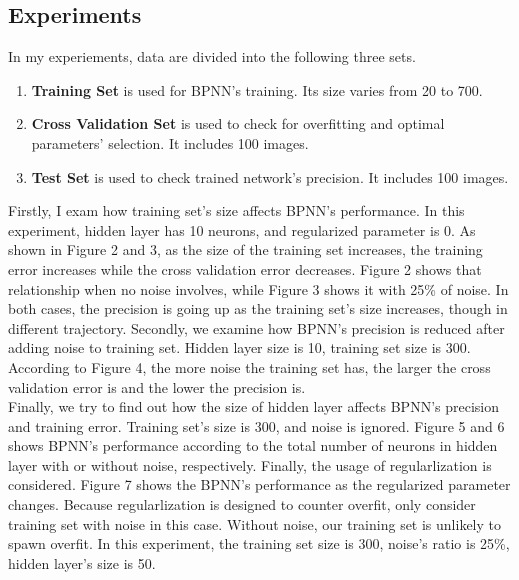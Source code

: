 \documentclass[a4paper, 11pt]{article}
\begin{document}
\subsection{Experiments}
In my experiements, data are divided into the following three sets.
\begin{enumerate}
\item \textbf{Training Set} is used for BPNN's training. Its size varies from 20 to 700.
\item \textbf{Cross Validation Set} is used to check for overfitting and optimal parameters' selection. It includes 100 images.
\item \textbf{Test Set} is used to check trained network's precision. It includes 100 images.
\end{enumerate}
Firstly, I exam how training set's size affects BPNN's performance. In this experiment, hidden layer has 10 neurons, and regularized parameter is 0. As shown in Figure 2 and 3, as the size of the training set increases, the training error increases while the cross validation error decreases. Figure 2 shows that relationship when no noise involves, while Figure 3 shows it with 25\% of noise. In both cases, the precision is going up as the training set's size increases, though in different trajectory.
Secondly, we examine how BPNN's precision is reduced after adding noise to training set. Hidden layer size is 10, training set size is 300. According to Figure 4, the more noise the training set has, the larger the cross validation error is and the lower the precision is. \\
Finally, we try to find out how the size of hidden layer affects BPNN's precision and training error. Training set's size is 300, and noise is ignored. Figure 5 and 6 shows BPNN's performance according to the total number of neurons in hidden layer with or without noise, respectively.
Finally, the usage of regularlization is considered. Figure 7 shows the BPNN's performance as the regularized parameter changes. Because regularlization is designed to counter overfit, only consider training set with noise in this case. Without noise, our training set is unlikely to spawn overfit. In this experiment, the training set size is 300, noise's ratio is 25\%, hidden layer's size is 50. 
\end{document}
